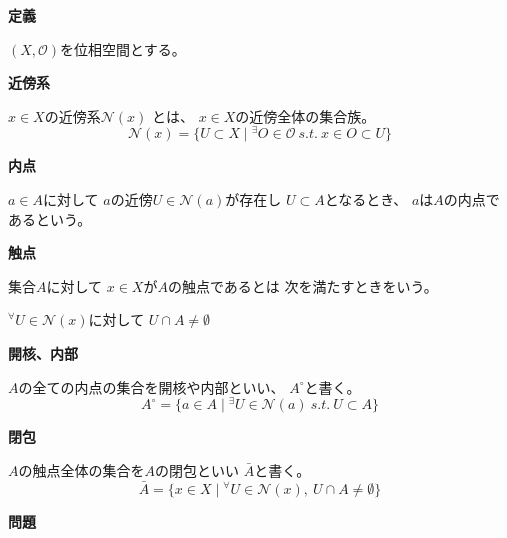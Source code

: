 \documentclass[12pt,b5paper]{ltjsarticle}
\begin{document}
\hrulefill
\textbf{定義}
\hrulefill

$(X,\mathcal{O})$を位相空間とする。

\textbf{近傍系}

$x\in X$の近傍系$\mathcal{N}(x)$
とは、
$x\in X$の近傍全体の集合族。
\begin{equation}
 \mathcal{N}(x) =
  \{ U \subset X \mid {}^{\exists}O \in\mathcal{O} \ s.t. \ x\in O \subset U \}
\end{equation}


\textbf{内点}

$a\in A$に対して
$a$の近傍$U\in\mathcal{N}(a)$が存在し
$U \subset A$となるとき、
$a$は$A$の内点であるという。


\textbf{触点}

集合$A$に対して
$x\in X$が$A$の触点であるとは
次を満たすときをいう。
\begin{center}
 ${}^{\forall}U\in\mathcal{N}(x)$に対して
 $U\cap A \ne\emptyset$
\end{center}

\textbf{開核、内部}

$A$の全ての内点の集合を開核や内部といい、
$A^{\circ}$と書く。
\begin{equation}
 A^{\circ}
  =
  \{
   a\in A \mid
   {}^{\exists} U \in \mathcal{N}(a) \ s.t. \ U \subset A
  \}
\end{equation}


\textbf{閉包}

$A$の触点全体の集合を$A$の閉包といい
$\bar{A}$と書く。
\begin{equation}
 \bar{A}=
  \{
    x\in X \mid
    {}^{\forall} U\in\mathcal{N}(x),\
    U\cap A \ne\emptyset
  \}
\end{equation}


\hrulefill
\textbf{問題}
\hrulefill
\end{document}
